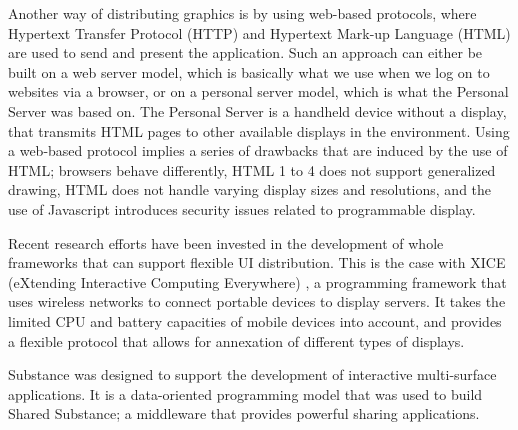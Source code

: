 Another way of distributing graphics is by using web-based protocols, where Hypertext Transfer Protocol (HTTP) and Hypertext Mark-up Language (HTML) are used to send and present the application.
Such an approach can either be built on a web server model, which is basically what we use when we log on to websites via a browser, or on a personal server model, which is what the Personal Server \citep{Want:2002:personalserver} was based on.
The Personal Server is a handheld device without a display, that transmits HTML pages to other available displays in the environment.
Using a web-based protocol implies a series of drawbacks that are induced by the use of HTML; browsers behave differently, HTML 1 to 4 does not support generalized drawing, HTML does not handle varying display sizes and resolutions, and the use of Javascript introduces security issues related to programmable display.

Recent research efforts have been invested in the development of whole frameworks that can support flexible UI distribution.
This is the case with XICE (eXtending Interactive Computing Everywhere) \citep{Arthur:2011:xice}, a programming framework that uses wireless networks to connect portable devices to display servers.
It takes the limited CPU and battery capacities of mobile devices into account, and provides a flexible protocol that allows for annexation of different types of displays.

Substance \citep{Gjerlufsen:2011:substance} was designed to support the development of interactive multi-surface applications.
It is a data-oriented programming model that was used to build Shared Substance; a middleware that provides powerful sharing applications.




